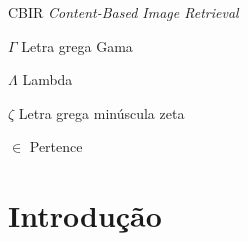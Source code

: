 \documentclass[
	12pt,				%
	openright,			%
	twoside,			%
	a4paper,			%
	english,			%
  	brazil				%
	]{abntex2}
\begin{document}

\listoffigures*
\cleardoublepage

\listoftables*
\cleardoublepage

\begin{siglas}
  \item[CBIR] \textit{Content-Based Image Retrieval}
\end{siglas}

\begin{simbolos}
  \item[$ \Gamma $] Letra grega Gama
  \item[$ \Lambda $] Lambda
  \item[$ \zeta $] Letra grega minúscula zeta
  \item[$ \in $] Pertence
\end{simbolos}

\tableofcontents*
\cleardoublepage


\textual

\chapter*[Introdução]{Introdução}


%





\end{document}
